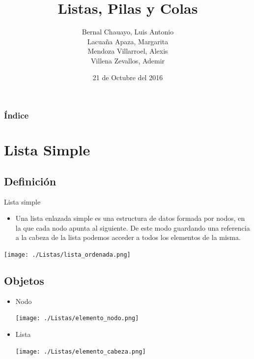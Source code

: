 \documentclass{beamer}
\title[Listas Pilas y colas]{Listas, Pilas y Colas}
\author[ALMA\and *Alexis\and Luis \and Margarita \and Ademir*]{{Bernal Chauayo, Luis Antonio}\\{Lacuaña Apaza, Margarita}\\{Mendoza Villarroel, Alexis}\\{Villena Zevallos, Ademir}}
\institute{{Ciencia de la Computación}
\\{Universidad Nacional de San Agustin}}
\date{21 de Octubre del 2016 }
\begin{document}
\begin{frame}[plain]
    \titlepage
 \end{frame}

 \begin{frame}
  \frametitle{Índice}
  \begin{multicols}{2}
  \tableofcontents
  \end{multicols} 
\end{frame}

\section{Lista Simple}

\subsection{Definición}
\begin{frame}
Lista simple \\
  \begin{itemize}
  \item Una lista enlazada simple es una estructura de datos formada por nodos, en la que cada nodo apunta al siguiente.  De este modo guardando una referencia a la cabeza de la lista podemos acceder a todos los elementos de la misma. 
  \end{itemize}
  \texttt{[image: ./Listas/lista\_ordenada.png]}
  
\end{frame}
    
\subsection{Objetos}
\begin{frame}
 \begin{itemize}
  \item Nodo
    \begin{center}
      \texttt{[image: ./Listas/elemento\_nodo.png]}
    
    \end{center}
   
    
  \item Lista
    \begin{center}
    \texttt{[image: ./Listas/elemento\_cabeza.png]}
    \end{center}  
 
 \end{itemize}

\end{frame}
\end{document}
